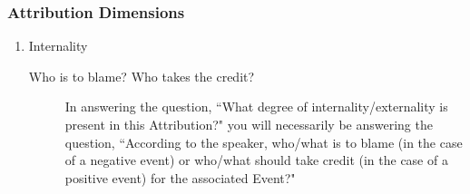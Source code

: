 \documentclass[a4paper,12pt]{article}
\begin{document}
    \subsubsection{Attribution Dimensions}
    \begin{enumerate}
    \item Internality
        \begin{description}
            \item[Who is to blame? Who takes the credit?] In answering the question, ``What degree of internality/externality is present in this Attribution?" you will necessarily be answering the question, ``According to the speaker, who/what is to blame (in the case of a negative event) or who/what should take credit (in the case of a positive event) for the associated Event?"
                

\end{description}
\end{enumerate}
\end{document}
